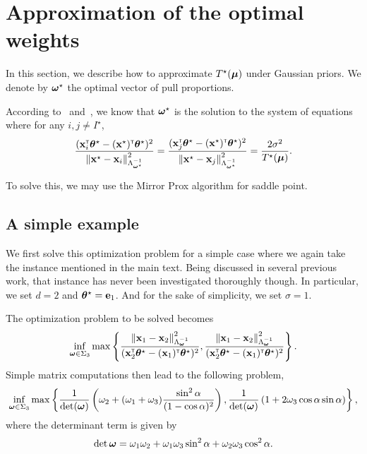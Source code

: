 \section{Approximation of the optimal weights}\label{app:lgc.approx}

In this section, we describe how to approximate $T^\star({\boldsymbol \mu})$ under Gaussian priors. We denote by ${\boldsymbol \omega}^\star$ the optimal vector of pull proportions.

According to~\cite{garivier2016tracknstop} and~\cite{russo2016ttts}, we know that ${\boldsymbol \omega}^\star$ is the solution to the system of equations where for any $i,j\neq I^\star$,
\[
    \frac{({\bf x}_i^\mathsf{\scriptscriptstyle T}{\boldsymbol \theta}^\star-({\bf x}^\star)^\mathsf{\scriptscriptstyle T}{\boldsymbol \theta}^\star)^2}{\left\lVert{\bf x}^\star - {\bf x}_i\right\rVert^2_{\Lambda_{{\boldsymbol \omega}^\star}^{-1}}} = \frac{({\bf x}_j^\mathsf{\scriptscriptstyle T}{\boldsymbol \theta}^\star-({\bf x}^\star)^\mathsf{\scriptscriptstyle T}{\boldsymbol \theta}^\star)^2}{\left\lVert{\bf x}^\star - {\bf x}_j\right\rVert^2_{\Lambda_{{\boldsymbol \omega}^\star}^{-1}}} = \frac{2\sigma^2}{T^\star({\boldsymbol \mu})}.
\]

\begin{remark}
To solve this, we may use the Mirror Prox algorithm for saddle point.
\end{remark}

\subsection{A simple example}

We first solve this optimization problem for a simple case where we again take the instance mentioned in the main text. Being discussed in several previous work, that instance has never been investigated thoroughly though. In particular, we set $d = 2$ and ${\boldsymbol \theta}^\star = {\bf e}_1$. And for the sake of simplicity, we set $\sigma = 1$.

The optimization problem to be solved becomes
\[
    \inf_{{\boldsymbol \omega}\in\Sigma_3} \max \left\{ \frac{\left\lVert{\bf x}_1 - {\bf x}_2\right\rVert^2_{\Lambda_{{\boldsymbol \omega}}^{-1}}}{({\bf x}_2^\mathsf{\scriptscriptstyle T}{\boldsymbol \theta}^\star-({\bf x}_1)^\mathsf{\scriptscriptstyle T}{\boldsymbol \theta}^\star)^2}, \frac{\left\lVert{\bf x}_1 - {\bf x}_2\right\rVert^2_{\Lambda_{{\boldsymbol \omega}}^{-1}}}{({\bf x}_2^\mathsf{\scriptscriptstyle T}{\boldsymbol \theta}^\star-({\bf x}_1)^\mathsf{\scriptscriptstyle T}{\boldsymbol \theta}^\star)^2} \right\}.
\]
Simple matrix computations then lead to the following problem,
\begin{equation}\label{eq:weights}
    \inf_{{\boldsymbol \omega}\in\Sigma_3} \max \left\{ \frac{1}{\det({\boldsymbol \omega})}\left(\omega_2+(\omega_1+\omega_3)\frac{\sin^2{\alpha}}{(1-\cos{\alpha})^2}\right), \frac{1}{\det({\boldsymbol \omega})}\left(1+2\omega_3\cos{\alpha}\sin{\alpha}\right) \right\},
\end{equation}
where the determinant term is given by
\[
    \det{{\boldsymbol \omega}} = \omega_1\omega_2 + \omega_1\omega_3\sin^2{\alpha} + \omega_2\omega_3\cos^2{\alpha}.
\]

